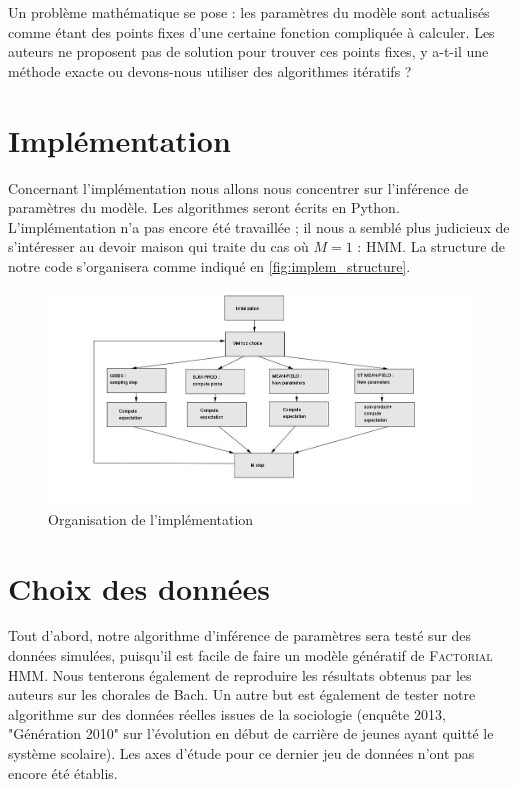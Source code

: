 \documentclass[10pt,a4paper]{article}
\newcommand{\hmm}{\textsc{HMM}}
\newcommand{\fhmm}{\textsc{Factorial HMM}}
\begin{document}
Un problème mathématique se pose : les paramètres du modèle sont actualisés
comme étant des points fixes d'une certaine fonction compliquée à calculer.
Les auteurs ne proposent pas de solution pour trouver ces points fixes, y
a-t-il une méthode exacte ou devons-nous utiliser des algorithmes itératifs ?

\section{Implémentation}

Concernant l'implémentation nous allons nous concentrer sur l'inférence de
paramètres du modèle.
Les algorithmes seront écrits en Python. L'implémentation n'a pas encore été
travaillée ; il nous a semblé plus judicieux de s'intéresser au devoir maison
qui traite du cas où $M=1$ : \hmm. La structure de notre code
s'organisera comme indiqué en \autoref{fig:implem_structure}.

\begin{figure}[hpbt]
  \centering
    \includegraphics[scale=1]{../resources/pictures/algograph.png}
  \caption{Organisation de l'implémentation\label{fig:implem_structure}}
\end{figure}

\section{Choix des données}

Tout d'abord, notre algorithme d'inférence de paramètres sera testé sur des
données simulées, puisqu'il est facile de faire un modèle génératif de
\fhmm.
Nous tenterons également de reproduire les résultats obtenus par les auteurs sur
les chorales de Bach.
Un autre but est également de tester notre algorithme sur des données réelles
issues de la sociologie (enquête 2013, "Génération 2010" sur l'évolution en
début de carrière de jeunes ayant quitté le système scolaire).
Les axes d'étude pour ce dernier jeu de données n'ont pas encore été établis.
\end{document}
